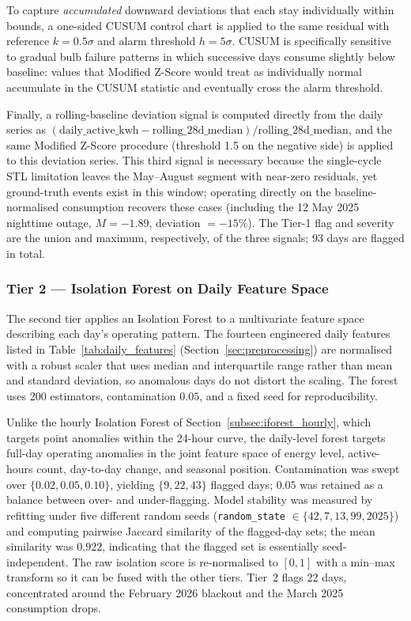 \documentclass{article}
\begin{document}
To capture \emph{accumulated} downward deviations that each stay individually within bounds, a one-sided CUSUM control chart \cite{page1954cusum} is applied to the same residual with reference $k=0.5\sigma$ and alarm threshold $h=5\sigma$. CUSUM is specifically sensitive to gradual bulb failure patterns in which successive days consume slightly below baseline: values that Modified Z-Score would treat as individually normal accumulate in the CUSUM statistic and eventually cross the alarm threshold.

Finally, a rolling-baseline deviation signal is computed directly from the daily series as $(\text{daily\_active\_kwh}-\text{rolling\_28d\_median})/\text{rolling\_28d\_median}$, and the same Modified Z-Score procedure (threshold 1.5 on the negative side) is applied to this deviation series. This third signal is necessary because the single-cycle STL limitation leaves the May--August segment with near-zero residuals, yet ground-truth events exist in this window; operating directly on the baseline-normalised consumption recovers these cases (including the 12 May 2025 nighttime outage, $M=-1.89$, deviation $=-15\%$). The Tier-1 flag and severity are the union and maximum, respectively, of the three signals; 93 days are flagged in total.

\subsubsection{Tier 2 --- Isolation Forest on Daily Feature Space}

The second tier applies an Isolation Forest \cite{liu2008isolation,liu2012isolation} to a multivariate feature space describing each day's operating pattern. The fourteen engineered daily features listed in Table~\ref{tab:daily_features} (Section~\ref{sec:preprocessing}) are normalised with a robust scaler \cite{pedregosa2011scikit} that uses median and interquartile range rather than mean and standard deviation, so anomalous days do not distort the scaling. The forest uses 200 estimators, contamination $0.05$, and a fixed seed for reproducibility.

Unlike the hourly Isolation Forest of Section~\ref{subsec:iforest_hourly}, which targets point anomalies within the 24-hour curve, the daily-level forest targets full-day operating anomalies in the joint feature space of energy level, active-hours count, day-to-day change, and seasonal position. Contamination was swept over $\{0.02,0.05,0.10\}$, yielding $\{9,22,43\}$ flagged days; $0.05$ was retained as a balance between over- and under-flagging. Model stability was measured by refitting under five different random seeds (\texttt{random\_state} $\in\{42,7,13,99,2025\}$) and computing pairwise Jaccard similarity of the flagged-day sets; the mean similarity was $0.922$, indicating that the flagged set is essentially seed-independent. The raw isolation score is re-normalised to $[0,1]$ with a min--max transform so it can be fused with the other tiers. Tier~2 flags 22 days, concentrated around the February 2026 blackout and the March 2025 consumption drops.
\end{document}
